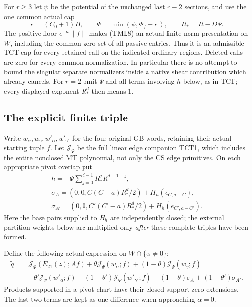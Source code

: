 For $r\ge3$ let $\psi$ be the potential of the unchanged last
$r-2$ sections, and use the one common actual cap
\[
       \kappa=(C_0+1)B,
       \qquad \Psi=\min(\psi,\Phi_f+\kappa),
       \qquad R_*=R-D\Psi.
 \tag{TML8}
\]
The positive floor $e^{-\kappa}\|f\|$ makes (TML8) an actual
finite norm presentation on $W$, including the common zero set
of all passive entries.  Thus it is an admissible TCT cap for
every retained call on the indicated ordinary regions.  Deleted
calls are zero for every common normalization.  In particular
there is no attempt to bound the singular separate normalizers
inside a native shear contribution which already cancels.
For $r=2$ omit $\Psi$ and all terms involving $h$ below, as in
TCT; every displayed exponent $R_*^d$ then means $1$.

\subsection{The explicit finite triple}

Write $w_\alpha,w_\gamma,w'_{\alpha},w'_{\gamma'}$ for the four
original GB words, retaining their actual starting tuple $f$.
Let $\mathcal J_\Psi$ be the full linear edge companion TCT1,
which includes the entire nonclosed MT polynomial, not only
the CS edge primitives.  On each appropriate pivot overlap put
\[
 \begin{gathered}
 h=-\Psi\sum_{j=0}^{d-1}R_*^jR^{d-1-j},\\
 \sigma_A=(0,0,C(C-a)R_*^d/2)+H_h(e_{C,a-C}),\\
 \sigma_{A'}=(0,0,C'(C'-a)R_*^d/2)+H_h(e_{C',a-C'}).
 \end{gathered}
 \tag{TML9}
\]
Here the base pairs supplied to $H_h$ are independently closed;
the external partition weights below are multiplied only
\emph{after} these complete triples have been formed.

Define the following actual expression on $W\cap\{\alpha\ne0\}$:
\[
\begin{split}
 \widetilde q={}&\mathcal J_\Psi(E_{21}(z);Af)
       +\theta\mathcal J_\Psi(w_\alpha;f)
       +(1-\theta)\mathcal J_\Psi(w_\gamma;f)\\
 &-\theta'\mathcal J_\Psi(w'_{\alpha};f)
       -(1-\theta')\mathcal J_\Psi(w'_{\gamma'};f)
       -(1-\theta)\sigma_A+(1-\theta')\sigma_{A'}.
\end{split}
 \tag{TML10}
\]
Products supported in a pivot chart have their closed-support
zero extensions.  The last two terms are kept as one difference
when approaching $\alpha=0$.

